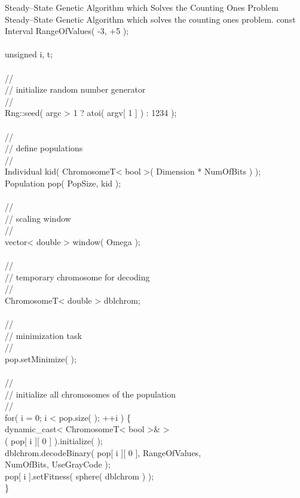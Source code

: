 \begin{programlisting}{Steady--State Genetic Algorithm which Solves the Counting Ones Problem}{
    Steady--State Genetic Algorithm which solves the counting ones problem.}
    const Interval RangeOfValues( -3, +5 );\\
\\
    unsigned i, t;\\
\\
    //\\
    // initialize random number generator\\
    //\\
    Rng::seed( argc > 1 ? atoi( argv[ 1 ] ) : 1234 );\\
\\
    //\\
    // define populations\\
    //\\
    Individual kid( ChromosomeT< bool >( Dimension * NumOfBits ) );\\
    Population pop( PopSize, kid );\\
\\
    //\\
    // scaling window\\
    //\\
    vector< double > window( Omega );\\
\\
    //\\
    // temporary chromosome for decoding\\
    //\\
    ChromosomeT< double > dblchrom;\\
\\
    //\\
    // minimization task\\
    //\\
    pop.setMinimize( );\\
\\
    //\\
    // initialize all chromosomes of the population\\
    //\\
    for( i = 0; i < pop.size( ); ++i ) \{\\
        dynamic_cast< ChromosomeT< bool >& >\\
            ( pop[ i ][ 0 ] ).initialize( );\\
        dblchrom.decodeBinary( pop[ i ][ 0 ], RangeOfValues,\\
                               NumOfBits, UseGrayCode );\\
        pop[ i ].setFitness( sphere( dblchrom ) );\\
    \}\\

\end{programlisting}
